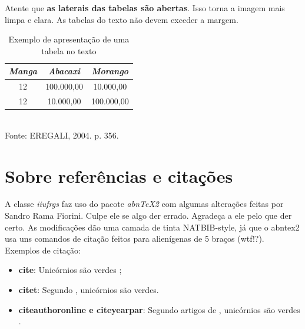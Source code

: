 \documentclass[rel_mlp]{iiufrgs}
\newcommand{\fonte}[1]{\\Fonte: {#1}}
\begin{document}
Atente que {\bf as laterais das tabelas são abertas}. Isso torna a imagem mais limpa e clara. As tabelas do texto não devem exceder a margem.


\begin{table}[ht]
  \caption{Exemplo de apresentação de uma tabela no texto}
  \centering
    \begin{tabular}{ c | c | c }
        \hline 
        \textit{Manga} & 
        \textit{Abacaxi} &  
        \textit{Morango}  \\
        \hline
        12    & 100.000,00     & 10.000,00 \\
        \hline
        12    & 10.000,00     & 100.000,00 \\
      \hline
    \end{tabular}
   \fonte{EREGALI, 2004. p. 356.}
  \label{tab:tabela2}
\end{table}



%
\chapter{Sobre referências e citações}

A classe \emph{iiufrgs} faz uso do pacote \emph{abnTeX2} com algumas alterações
feitas por Sandro Rama Fiorini. Culpe ele se algo der errado. Agradeça a ele
pelo que der certo. As modificações dão uma camada de tinta NATBIB-style,
já que o abntex2 usa uns comandos de citação feitos para alienígenas de 5 braços (wtf!?). \\

Exemplos de citação:
\begin{itemize}[leftmargin=3em]

\setlength{\itemindent}{1em}

 \item \textbf{cite}: Unicórnios são verdes \cite{Adams2009Conceptual};
    
 \item \textbf{citet}: Segundo \citet{Adams2009Conceptual}, unicórnios são verdes.
    
 \item \textbf{citeauthoronline e citeyearpar}: Segundo artigos de , unicórnios são verdes \citeyearpar{Adams2009Conceptual}.
    
\end{itemize}
 
\end{document}
